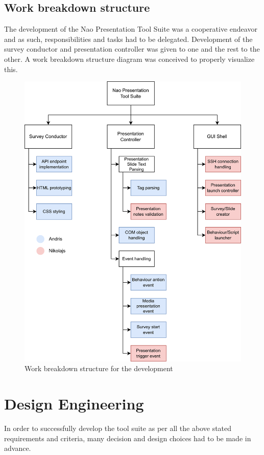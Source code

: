\documentclass[12pt, fleqn, a4paper]{article}
\begin{document}
\subsection{Work breakdown structure}
The development of the Nao Presentation Tool Suite was a cooperative endeavor and as such, responsibilities and tasks had to be delegated. Development of the survey conductor and presentation controller was given to one and the rest to the other. A work breakdown structure diagram was conceived to properly visualize this.
\begin{figure}[H]
	\centering
	\includegraphics[width=1\textwidth]{img/wbs2.png}
	\caption{Work breakdown structure for the development}
\end{figure}

\section{Design Engineering} %
In order to successfully develop the tool suite as per all the above stated requirements and criteria, many decision and design choices had to be made in advance.
\end{document}
